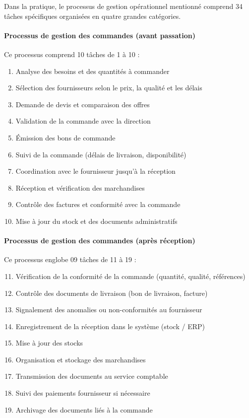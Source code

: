 \documentclass[a4paper,12pt]{report}
\begin{document}
Dans la pratique, le processus de gestion opérationnel mentionné comprend 34 tâches spécifiques organisées en quatre grandes catégories.

\paragraph{Processus de gestion des commandes (avant passation)}

Ce processus comprend 10 tâches de 1 à 10 :

\begin{enumerate}
\item Analyse des besoins et des quantités à commander
\item Sélection des fournisseurs selon le prix, la qualité et les délais
\item Demande de devis et comparaison des offres
\item Validation de la commande avec la direction
\item Émission des bons de commande
\item Suivi de la commande (délais de livraison, disponibilité)
\item Coordination avec le fournisseur jusqu'à la réception
\item Réception et vérification des marchandises
\item Contrôle des factures et conformité avec la commande
\item Mise à jour du stock et des documents administratifs
\end{enumerate}

\paragraph{Processus de gestion des commandes (après réception)}

Ce processus englobe 09 tâches de 11 à 19 :

\begin{enumerate}
\setcounter{enumi}{10}
\item Vérification de la conformité de la commande (quantité, qualité, références)
\item Contrôle des documents de livraison (bon de livraison, facture)
\item Signalement des anomalies ou non-conformités au fournisseur
\item Enregistrement de la réception dans le système (stock / ERP)
\item Mise à jour des stocks
\item Organisation et stockage des marchandises
\item Transmission des documents au service comptable
\item Suivi des paiements fournisseur si nécessaire
\item Archivage des documents liés à la commande
\end{enumerate}
\end{document}
